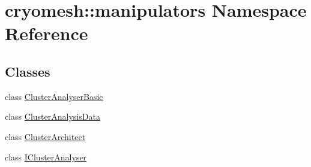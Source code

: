 \hypertarget{namespacecryomesh_1_1manipulators}{\section{cryomesh\-:\-:manipulators \-Namespace \-Reference}
\label{namespacecryomesh_1_1manipulators}
}
\subsection*{\-Classes}
\begin{DoxyCompactItemize}
\item 
class \hyperlink{classcryomesh_1_1manipulators_1_1ClusterAnalyserBasic}{\-Cluster\-Analyser\-Basic}
\item 
class \hyperlink{classcryomesh_1_1manipulators_1_1ClusterAnalysisData}{\-Cluster\-Analysis\-Data}
\item 
class \hyperlink{classcryomesh_1_1manipulators_1_1ClusterArchitect}{\-Cluster\-Architect}
\item 
class \hyperlink{classcryomesh_1_1manipulators_1_1IClusterAnalyser}{\-I\-Cluster\-Analyser}
\end{DoxyCompactItemize}
